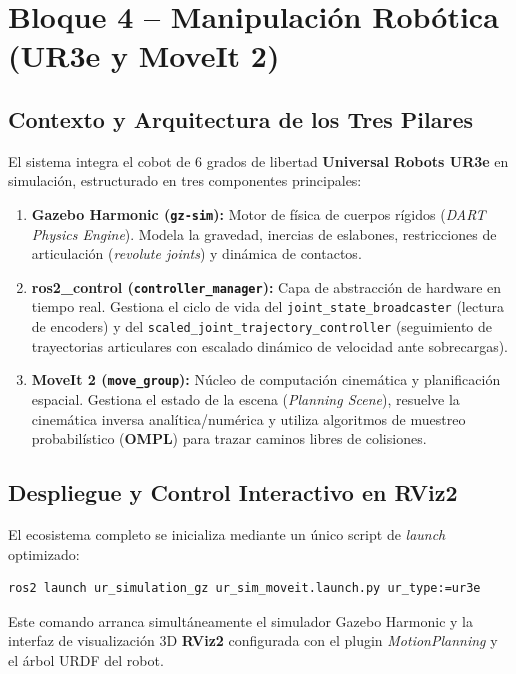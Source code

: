 \documentclass[11pt,a4paper]{article}
\begin{document}
\section{Bloque 4 -- Manipulación Robótica (UR3e y MoveIt 2)}

\subsection{Contexto y Arquitectura de los Tres Pilares}

El sistema integra el cobot de 6 grados de libertad \textbf{Universal Robots UR3e} en simulación, estructurado en tres componentes principales:

\begin{enumerate}
    \item \textbf{Gazebo Harmonic (\texttt{gz-sim}):} Motor de física de cuerpos rígidos (\textit{DART Physics Engine}). Modela la gravedad, inercias de eslabones, restricciones de articulación (\textit{revolute joints}) y dinámica de contactos.
    \item \textbf{ros2\_control (\texttt{controller\_manager}):} Capa de abstracción de hardware en tiempo real. Gestiona el ciclo de vida del \texttt{joint\_state\_broadcaster} (lectura de encoders) y del \texttt{scaled\_joint\_}\-\texttt{trajectory\_controller} (seguimiento de trayectorias articulares con escalado dinámico de velocidad ante sobrecargas).
    \item \textbf{MoveIt 2 (\texttt{move\_group}):} Núcleo de computación cinemática y planificación espacial. Gestiona el estado de la escena (\textit{Planning Scene}), resuelve la cinemática inversa analítica/numérica y utiliza algoritmos de muestreo probabilístico (\textbf{OMPL}) para trazar caminos libres de colisiones.
\end{enumerate}

\subsection{Despliegue y Control Interactivo en RViz2}

El ecosistema completo se inicializa mediante un único script de \textit{launch} optimizado:
\begin{lstlisting}[language=bash]
ros2 launch ur_simulation_gz ur_sim_moveit.launch.py ur_type:=ur3e
\end{lstlisting}
Este comando arranca simultáneamente el simulador Gazebo Harmonic y la interfaz de visualización 3D \textbf{RViz2} configurada con el plugin \textit{MotionPlanning} y el árbol URDF del robot.
\end{document}
